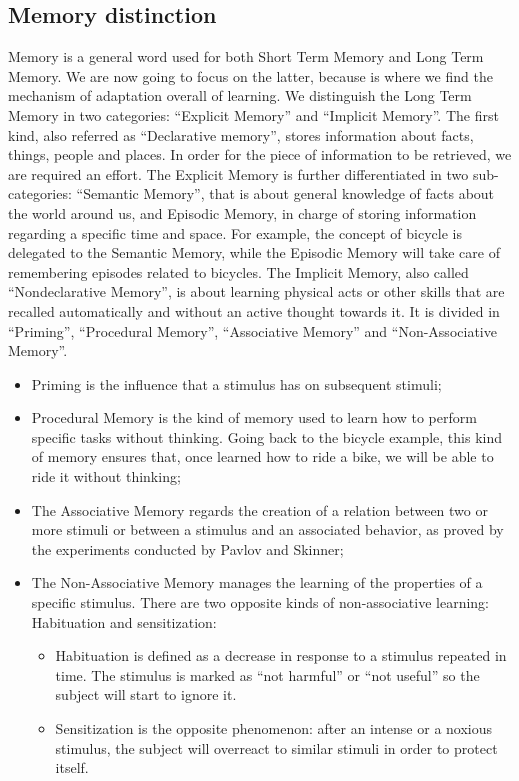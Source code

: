 \documentclass[conference]{IEEEtran}
\begin{document}
	\subsection{Memory distinction}\label{AA}
		Memory is a general word used for both Short Term Memory and Long Term Memory. We are now going to focus on the latter, because is where we find the mechanism of adaptation overall of learning.
		We distinguish the Long Term Memory in two categories: ``Explicit Memory'' and ``Implicit Memory''.
		The first kind, also referred as ``Declarative memory'',  stores information about facts, things, people and places. In order for the piece of information to be retrieved, we are required an effort.
		The Explicit Memory is further differentiated in two sub-categories: ``Semantic Memory'', that is about general knowledge of facts about the world around us, and Episodic Memory, in charge of storing information regarding a specific time and space.
		For example, the concept of bicycle is delegated to the Semantic Memory, while the Episodic Memory will take care of remembering episodes related to bicycles.
		The Implicit Memory, also called ``Nondeclarative Memory'', is about learning physical acts or other skills that are recalled automatically and without an active thought towards it.
		It is divided in ``Priming'', ``Procedural Memory'', ``Associative Memory'' and ``Non-Associative Memory''.
		\begin{itemize}
			\item Priming is the influence that a stimulus has on subsequent stimuli;
			\item Procedural Memory is the kind of memory used to learn how to perform specific tasks without thinking. Going back to the bicycle example, this kind of memory ensures that, once learned how to ride a bike, we will be able to ride it without thinking;
			\item The Associative Memory regards the creation of a relation between two or more stimuli or between a stimulus and an associated behavior, as proved by the experiments conducted by Pavlov and Skinner;
			\item The Non-Associative Memory manages the learning of the properties of a specific stimulus. There are two opposite kinds of non-associative learning: Habituation and sensitization:
			\begin{itemize}
				\item Habituation is defined as a decrease in response to a stimulus repeated in time. The stimulus is marked as ``not harmful'' or ``not useful'' so the subject will start to ignore it.
				\item Sensitization is the opposite phenomenon: after an intense or a noxious stimulus, the subject will overreact to similar stimuli in order to protect itself.
			\end{itemize}
		\end{itemize}
\end{document}
